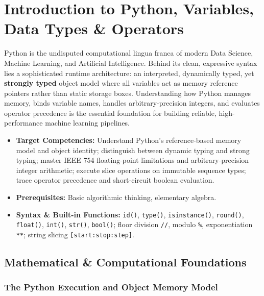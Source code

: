 \chapter{Introduction to Python, Variables, Data Types \& Operators}

Python is the undisputed computational lingua franca of modern Data Science, Machine Learning, and Artificial Intelligence. Behind its clean, expressive syntax lies a sophisticated runtime architecture: an interpreted, dynamically typed, yet \textbf{strongly typed} object model where all variables act as memory reference pointers rather than static storage boxes. Understanding how Python manages memory, binds variable names, handles arbitrary-precision integers, and evaluates operator precedence is the essential foundation for building reliable, high-performance machine learning pipelines.

\vspace{0.5cm}
\begin{tcolorbox}[colback=primarylight, colframe=primarydark, title={\textbf{Executive Roadmap \& Learning Objectives}}]
\begin{itemize}
    \item \textbf{Target Competencies:} Understand Python's reference-based memory model and object identity; distinguish between dynamic typing and strong typing; master IEEE 754 floating-point limitations and arbitrary-precision integer arithmetic; execute slice operations on immutable sequence types; trace operator precedence and short-circuit boolean evaluation.
    \item \textbf{Prerequisites:} Basic algorithmic thinking, elementary algebra.
    \item \textbf{Syntax \& Built-in Functions:} \texttt{id()}, \texttt{type()}, \texttt{isinstance()}, \texttt{round()}, \texttt{float()}, \texttt{int()}, \texttt{str()}, \texttt{bool()}; floor division \texttt{//}, modulo \texttt{\%}, exponentiation \texttt{**}; string slicing \texttt{[start:stop:step]}.
\end{itemize}
\end{tcolorbox}

\section{Mathematical \& Computational Foundations}

\subsection{The Python Execution and Object Memory Model}

